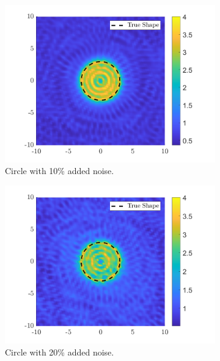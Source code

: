 \documentclass[]{article}
\begin{document}
				\begin{figure}[h]
					\centering
					\begin{subfigure}{.3\textwidth}
						\centering
						\includegraphics[width = \textwidth]{Numeric Simulations/Images/circle-10-noise-reconstructed}
						\caption{Circle with 10\% added noise.}
					\end{subfigure}
					\begin{subfigure}{.3\textwidth}
						\centering
						\includegraphics[width = \textwidth]{Numeric Simulations/Images/circle-20-noise-reconstructed}
						\caption{Circle with 20\% added noise.}
					\end{subfigure}
					\begin{subfigure}{.3\textwidth}

\end{subfigure}
\end{figure}
\end{document}
